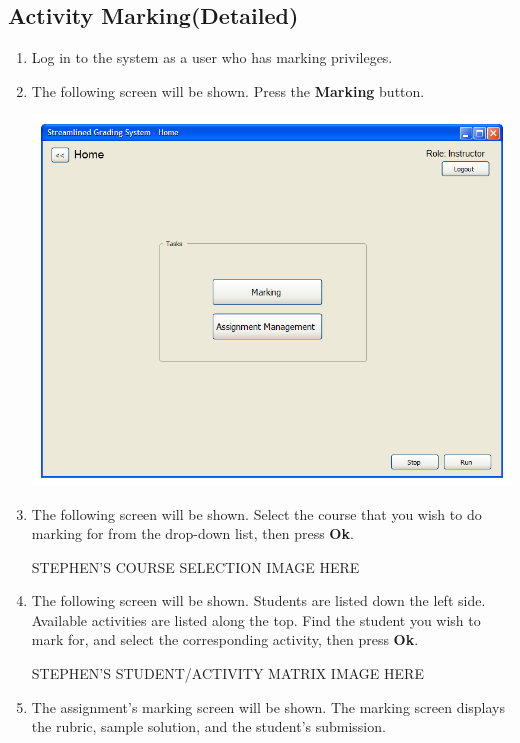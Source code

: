 \documentclass{article}
\begin{document}
\subsection{Activity Marking(Detailed)}
\begin{enumerate}
  \item Log in to the system as a user who has marking privileges.
  \item The following screen will be shown.  Press the \textbf{Marking} button.
  \begin{center} 
   \includegraphics[scale=0.55]{../images/UIMockups/PNG_Renders/LandingPage}
  \end{center}
  \item The following screen will be shown.  Select the course that you wish
    to do marking for from the drop-down list, then press \textbf{Ok}.
    \begin{center} 
      STEPHEN'S COURSE SELECTION IMAGE HERE
    \end{center}
  \item The following screen will be shown.  Students are listed down the left
    side. Available activities are listed along the top.  Find the student you
    wish to mark for, and select the corresponding activity, then press \textbf{Ok}.
  \begin{center} 
    STEPHEN'S STUDENT/ACTIVITY MATRIX IMAGE HERE
  \end{center}
  \item The assignment's marking screen will be shown.  The marking screen
    displays the rubric, sample solution, and the student's submission.

\end{enumerate}
\end{document}
